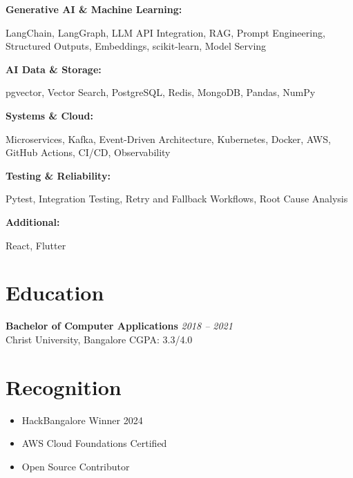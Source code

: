\documentclass[11pt,a4paper]{article}
\newcommand{\skillcategory}[2]{
  \textbf{\color{navyblue}#1:} \raggedright #2
}
\begin{document}
\skillcategory{Generative AI \& Machine Learning}{LangChain, LangGraph, LLM API Integration, RAG, Prompt Engineering, Structured Outputs, Embeddings, scikit-learn, Model Serving}

\vspace{2pt}

\skillcategory{AI Data \& Storage}{pgvector, Vector Search, PostgreSQL, Redis, MongoDB, Pandas, NumPy}

\vspace{2pt}

\skillcategory{Systems \& Cloud}{Microservices, Kafka, Event-Driven Architecture, Kubernetes, Docker, AWS, GitHub Actions, CI/CD, Observability}

\vspace{2pt}

\skillcategory{Testing \& Reliability}{Pytest, Integration Testing, Retry and Fallback Workflows, Root Cause Analysis}

\vspace{2pt}

\skillcategory{Additional}{React, Flutter}

\vspace{2pt}

\section{Education}

\textbf{\color{navyblue}Bachelor of Computer Applications} \hfill \textit{\color{lightgray}2018 -- 2021}\\
Christ University, Bangalore \hfill CGPA: 3.3/4.0

\vspace{2pt}

\section{Recognition}

\begin{itemize}
\item HackBangalore Winner 2024
\item AWS Cloud Foundations Certified
\item Open Source Contributor
\end{itemize}

\vspace{2pt}

\end{document}
